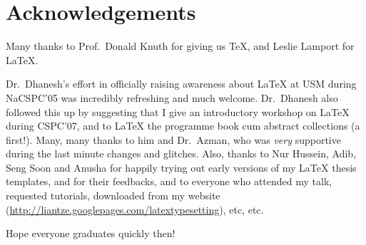 \chapter{Acknowledgements}

Many thanks to Prof.~Donald Knuth for giving us \TeX, and Leslie Lamport for \LaTeX.  

Dr.~Dhanesh's effort in officially raising awareness about \LaTeX{} at USM during NaCSPC'05 was incredibly refreshing and much welcome. Dr.~Dhanesh also followed this up by suggesting that I give an introductory workshop on \LaTeX{} during CSPC'07, and to \LaTeX{} the programme book cum abstract collections (a first!).  Many, many thanks to him and Dr.~Azman, who was \emph{very} supportive during the last minute changes and glitches.  Also, thanks to Nur Hussein, Adib, Seng Soon and Anusha for happily trying out early versions of my \LaTeX{} thesis templates, and for their feedbacks, and to everyone who attended my talk, requested tutorials, downloaded from my website (\url{http://liantze.googlepages.com/latextypesetting}), etc, etc.

Hope everyone graduates quickly then!


